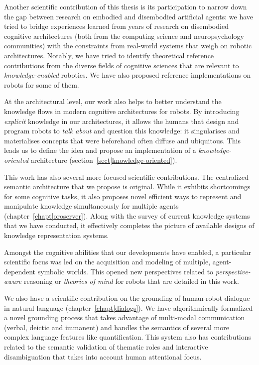 Another scientific contribution of this thesis is its participation to narrow
down the gap between research on embodied and disembodied artificial agents: we
have tried to bridge experiences learned from years of research on disembodied
cognitive architectures (both from the computing science and neuropsychology
communities) with the constraints from real-world systems that weigh on robotic
architectures. Notably, we have tried to identify theoretical reference
contributions from the diverse fields of cognitive sciences that are relevant
to \emph{knowledge-enabled} robotics. We have also proposed reference
implementations on robots for some of them.

At the architectural level, our work also helps to better understand the
knowledge flows in modern cognitive architectures for robots. By introducing
\emph{explicit} knowledge in our architectures, it allows the humans that
design and program robots to \emph{talk about} and question this knowledge: it
singularises and materialises concepts that were beforehand often diffuse and
ubiquitous. This leads us to define the idea and propose an implementation of a
\emph{knowledge-oriented} architecture (section~\ref{sect|knowledge-oriented}).

This work has also several more focused scientific contributions. The
centralized semantic architecture that we propose is original. While it
exhibits shortcomings for some cognitive tasks, it also proposes novel
efficient ways to represent and manipulate knowledge simultaneously for
multiple agents (chapter~\ref{chapt|oroserver}). Along with the survey of
current knowledge systems that we have conducted, it effectively completes the
picture of available designs of knowledge representation systems.

Amongst the cognitive abilities that our developments have enabled, a
particular scientific focus was led on the acquisition and modeling of
multiple, agent-dependent symbolic worlds. This opened new perspectives related
to \emph{perspective-aware} reasoning or \emph{theories of mind} for robots
that are detailed in this work.

We also have a scientific contribution on the grounding of human-robot dialogue
in natural language (chapter~\ref{chapt|dialogs}). We have algorithmically
formalized a novel grounding process that takes advantage of multi-modal
communication (verbal, deictic and immanent) and handles the semantics of
several more complex language features like quantification. This system also
has contributions related to the semantic validation of thematic roles and
interactive disambiguation that takes into account human attentional focus.

